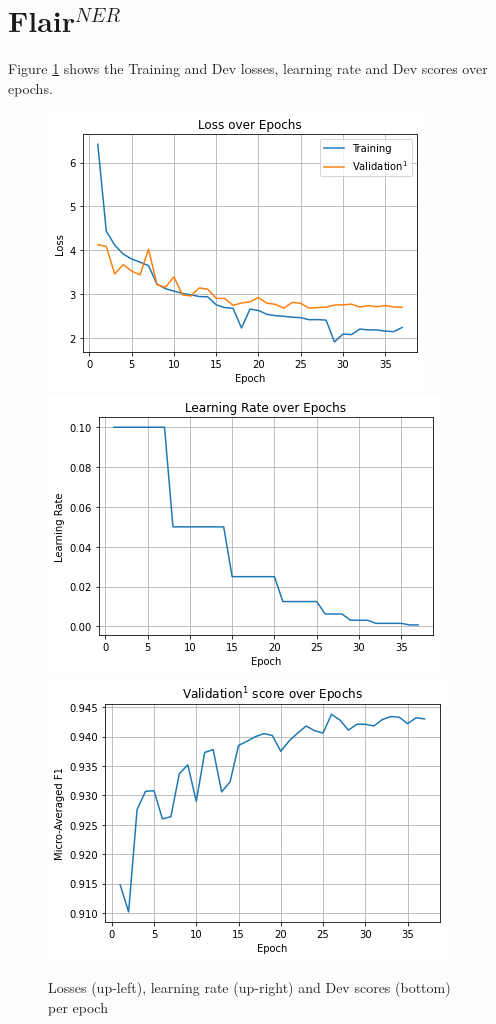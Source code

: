 \documentclass{report}
\theoremstyle{definition}
\theoremstyle{remark}
\begin{document}
\section{Flair$^{NER}$}
\label{sec:app:flairner}
Figure \ref{fig:flairtrain} shows the Training and Dev losses, learning rate and Dev scores over epochs. 
\begin{figure}[H]
    \centering
    \includegraphics[scale=0.45]{flair_loss.png}
    \includegraphics[scale=0.45]{flair_lrs.png}
    \includegraphics[scale=0.45]{flair_scores.png}
    \caption{Losses (up-left), learning rate (up-right) and Dev scores (bottom) per epoch}
    \label{fig:flairtrain}
\end{figure}
\newpage
\end{document}
